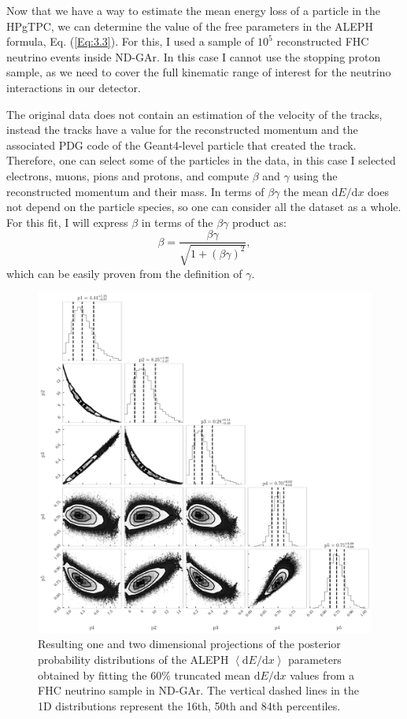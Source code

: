 Now that we have a way to estimate the mean energy loss of a particle in the HPgTPC, we can determine the value of the free parameters in the ALEPH formula, Eq. (\ref{Eq:3.3}). For this, I used a sample of $10^{5}$ reconstructed FHC neutrino events inside ND-GAr. In this case I cannot use the stopping proton sample, as we need to cover the full kinematic range of interest for the neutrino interactions in our detector.

The original data does not contain an estimation of the velocity of the tracks, instead the tracks have a value for the reconstructed momentum and the associated PDG code of the Geant4-level particle that created the track. Therefore, one can select some of the particles in the data, in this case I selected electrons, muons, pions and protons, and compute $\beta$ and $\gamma$ using the reconstructed momentum and their mass. In terms of $\beta\gamma$ the mean $\mathrm{d}E/\mathrm{d}x$ does not depend on the particle species, so one can consider all the dataset as a whole. For this fit, I will express $\beta$ in terms of the $\beta\gamma$ product as:
\begin{equation}
    \beta = \frac{\beta\gamma}{\sqrt{1+(\beta\gamma)^{2}}},
\end{equation}
which can be easily proven from the definition of $\gamma$.

\begin{figure}[t]
	\centering
	\includegraphics[width=.85\linewidth]{Images/GArSoft_PID/dEdx/mcmc_weighted_equal_frequency_bin_200.pdf}
	\caption[Resulting one and two dimensional projections of the posterior probability distributions of the ALEPH $\left<\mathrm{d}E/\mathrm{d}x\right>$ parameters obtained by fitting the $60\%$ truncated mean $\mathrm{d}E/\mathrm{d}x$ values from a FHC neutrino sample.]{Resulting one and two dimensional projections of the posterior probability distributions of the ALEPH $\left<\mathrm{d}E/\mathrm{d}x\right>$ parameters obtained by fitting the $60\%$ truncated mean $\mathrm{d}E/\mathrm{d}x$ values from a FHC neutrino sample in ND-GAr. The vertical dashed lines in the 1D distributions represent the 16th, 50th and 84th percentiles.}
	\label{fig:dEdx_ALEPH_fit}
\end{figure}

